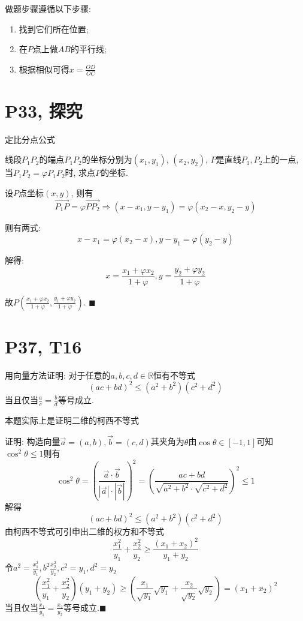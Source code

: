 \documentclass{book}
\begin{document}
        做题步骤遵循以下步骤:
        \begin{enumerate}
            \item 找到它们所在位置;
            \item 在$P$点上做$AB$的平行线;
            \item 根据相似可得$\displaystyle x=\frac{OD}{OC}$
        \end{enumerate}

        \section{\textcolor[rgb]{0.11,0.65,0.52}{P33, 探究}}
        
        \begin{boxB}
            定比分点公式

            线段$P_1P_2$的端点$P_1P_2$的坐标分别为$(x_1,y_1)$, $(x_2,y_2)$, $P$是直线$P_1,P_2$上的一点, 当$P_1P_2=\varphi P_1P_2$时, 求点$P$的坐标.
        \end{boxB}
        设$P$点坐标$(x,y)$, 则有$$\overrightarrow{P_1P}=\varphi \overrightarrow{PP_2}\Longrightarrow (x-x_1,y-y_1)=\varphi(x_2-x, y_2-y)$$

        则有两式: $$x-x_1=\varphi (x_2-x),y-y_1=\varphi (y_2-y)$$

        解得:$$x=\frac{x_1+\varphi x_2}{1+\varphi},y=\frac{y_2+\varphi y_2}{1+\varphi}$$
        
        故$\displaystyle P(\frac{x_1+\varphi x_2}{1+\varphi},\frac{y_1+\varphi y_2}{1+\varphi})$. $\blacksquare$

        \section{\textcolor[rgb]{0.11,0.65,0.52}{P37, T16}}
        \begin{boxB}
            用向量方法证明: 对于任意的$a,b,c,d \in \mathbb{R}$恒有不等式$$(ac+bd)^2\le(a^2+b^2)(c^2+d^2)$$
            当且仅当$\displaystyle \frac{a}{c}=\frac{b}{d}$等号成立.
        \end{boxB}

        本题实际上是证明\textcolor[rgb]{0.38,0.11,0.2}{二维的柯西不等式}

        证明: 构造向量$\overrightarrow{a}=(a,b),\overrightarrow{b}=(c,d)$其夹角为$\theta$由$\cos \theta \in [-1,1]$可知$\cos ^2 \theta \le 1$则有$$\cos ^2 \theta=\left (\frac{\overrightarrow{a}\cdot \overrightarrow{b}}{|\overrightarrow{a}|\cdot |\overrightarrow{b}|}\right ) ^2=\left ( \frac{ac+bd}{\sqrt{a^2+b^2}\cdot \sqrt{c^2+d^2}} \right )^2 \le 1$$
        解得$$(ac+bd)^2 \le (a^2+b^2)(c^2+d^2)$$
        由\textcolor[rgb]{0.38,0.11,0.2}{柯西不等式}可引申出\textcolor[rgb]{0.38,0.11,0.2}{二维的权方和不等式}$$\frac{x_1^2}{y_1}+\frac{x_2^2}{y_2}\ge \frac{(x_1+x_2)^2}{y_1+y_2}$$
        令$\displaystyle a^2=\frac{x_1^2}{y_1},b^2\frac{x_2^2}{y_2},c^2=y_1,d^2=y_2$
        $$\left ( \frac{x_1^2}{y_1}+\frac{x_2^2}{y_2} \right )(y_1+y_2)\ge \left ( \frac{x_1}{\sqrt{y_1}}\sqrt{y_1}+\frac{x_2}{\sqrt{y_2}}\sqrt{y_2} \right )=(x_1+x_2)^2$$
        当且仅当$\displaystyle \frac{x_1}{y_1}=\frac{x_2}{y_2}$等号成立.$\blacksquare$
\end{document}
